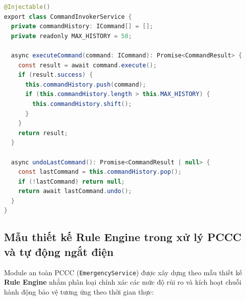 \begin{lstlisting}[language=Java, caption={Hiện thực Command Invoker và cơ chế Undo trong NestJS}, label={lst:command_invoker}]
@Injectable()
export class CommandInvokerService {
  private commandHistory: ICommand[] = [];
  private readonly MAX_HISTORY = 50;

  async executeCommand(command: ICommand): Promise<CommandResult> {
    const result = await command.execute();
    if (result.success) {
      this.commandHistory.push(command);
      if (this.commandHistory.length > this.MAX_HISTORY) {
        this.commandHistory.shift();
      }
    }
    return result;
  }

  async undoLastCommand(): Promise<CommandResult | null> {
    const lastCommand = this.commandHistory.pop();
    if (!lastCommand) return null;
    return await lastCommand.undo();
  }
}
\end{lstlisting}

\subsection{Mẫu thiết kế Rule Engine trong xử lý PCCC và tự động ngắt điện}
\label{subsec:rule_engine_pccc}

Module an toàn PCCC (\texttt{EmergencyService}) được xây dựng theo mẫu thiết kế \textbf{Rule Engine} nhằm phân loại chính xác các mức độ rủi ro và kích hoạt chuỗi hành động bảo vệ tương ứng theo thời gian thực:


